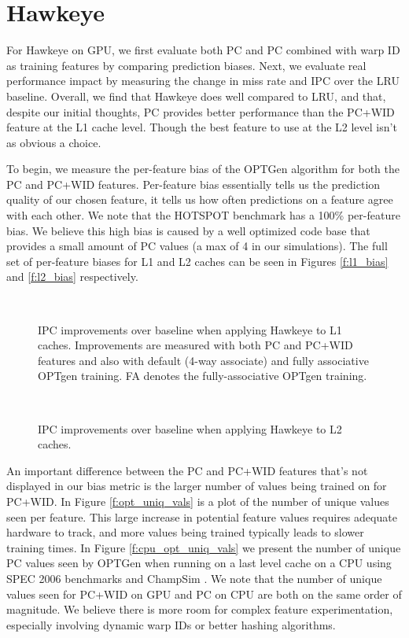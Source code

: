 \section{Hawkeye}
For Hawkeye on GPU, we first evaluate both PC and PC combined with warp ID as training features by comparing prediction biases. Next, we evaluate real performance impact by measuring the change in miss rate and IPC over the LRU baseline. Overall, we find that Hawkeye does well compared to LRU, and that, despite our initial thoughts, PC provides better performance than the PC+WID feature at the L1 cache level. Though the best feature to use at the L2 level isn't as obvious a choice.

To begin, we measure the per-feature bias of the OPTGen algorithm for both the PC and PC+WID features. Per-feature bias essentially tells us the prediction quality of our chosen feature, it tells us how often predictions on a feature agree with each other. We note that the HOTSPOT benchmark has a 100\% per-feature bias. We believe this high bias is caused by a well optimized code base that provides a small amount of PC values (a max of 4 in our simulations). The full set of per-feature biases for L1 and L2 caches can be seen in Figures \ref{f:l1_bias} and \ref{f:l2_bias} respectively.

\begin{figure}[htb]
\begin{center}
\ 
\caption{IPC improvements over baseline when applying Hawkeye to L1 caches. Improvements are measured with both PC and PC+WID features and also with default (4-way associate) and fully associative OPTgen training. FA denotes the fully-associative OPTgen training.}
\label{f:l1_ipc}
\end{center}
\end{figure}

\begin{figure}[htb]
\begin{center}
\ 
\caption{IPC improvements over baseline when applying Hawkeye to L2 caches.}
\label{f:l2_ipc}
\end{center}
\end{figure}

An important difference between the PC and PC+WID features that's not displayed in our bias metric is the larger number of values being trained on for PC+WID. In Figure \ref{f:opt_uniq_vals} is a plot of the number of unique values seen per feature. This large increase in potential feature values requires adequate hardware to track, and more values being trained typically leads to slower training times. In Figure \ref{f:cpu_opt_uniq_vals} we present the number of unique PC values seen by OPTGen when running on a last level cache on a CPU using SPEC 2006 \cite{spec} benchmarks and ChampSim \cite{champsim}. We note that the number of unique values seen for PC+WID on GPU and PC on CPU are both on the same order of magnitude. We believe there is more room for complex feature experimentation, especially involving dynamic warp IDs or better hashing algorithms.

